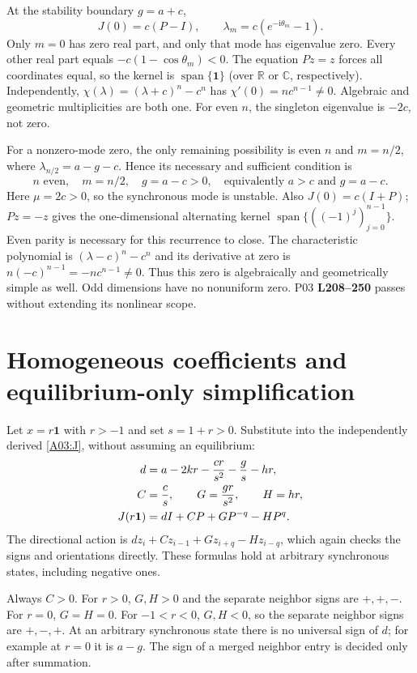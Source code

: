 \documentclass[11pt]{article}
\newcommand{\RR}{\mathbb R}
\newcommand{\CC}{\mathbb C}
\newcommand{\one}{\mathbf 1}
\newcommand{\lin}[1]{\textbf{L#1}}
\begin{document}
At the stability boundary $g=a+c$,
\[
 J(0)=c(P-I),\qquad
 \lambda_m=c(e^{-\mathrm i\theta_m}-1).
\]
Only $m=0$ has zero real part, and only that mode has eigenvalue zero.
Every other real part equals $-c(1-\cos\theta_m)<0$. The equation
$Pz=z$ forces all coordinates equal, so the kernel is
$\operatorname{span}\{\one\}$ (over $\RR$ or $\CC$, respectively).
Independently, $\chi(\lambda)=(\lambda+c)^n-c^n$ has
$\chi'(0)=n c^{n-1}\ne0$. Algebraic and geometric multiplicities are both
one. For even $n$, the singleton eigenvalue is $-2c$, not zero.

For a nonzero-mode zero, the only remaining possibility is even $n$ and
$m=n/2$, where $\lambda_{n/2}=a-g-c$. Hence its necessary and sufficient
condition is
\[
 n\text{ even},\quad m=n/2,\quad g=a-c>0,
 \quad\text{equivalently }a>c\text{ and }g=a-c.
\]
Here $\mu=2c>0$, so the synchronous mode is unstable. Also $J(0)=c(I+P)$;
$Pz=-z$ gives the one-dimensional alternating kernel
$\operatorname{span}\{((-1)^j)_{j=0}^{n-1}\}$. Even parity is necessary
for this recurrence to close. The characteristic polynomial is
$(\lambda-c)^n-c^n$ and its derivative at zero is
$n(-c)^{n-1}=-n c^{n-1}\ne0$. Thus this zero is algebraically and
geometrically simple as well. Odd dimensions have no nonuniform zero.
P03 \lin{208--250} passes without extending its nonlinear scope.

\section{Homogeneous coefficients and equilibrium-only simplification}
Let $x=r\one$ with $r>-1$ and set $s=1+r>0$. Substitute into the
independently derived \eqref{A03:J}, without assuming an equilibrium:
\begin{align}
 d&=a-2kr-\frac{cr}{s^2}-\frac{g}{s}-hr,\notag\\
 C&=\frac{c}{s},\qquad G=\frac{gr}{s^2},\qquad H=hr,\label{A03:homcoef}\\
 J(r\one)&=dI+CP+GP^{-q}-HP^q.\label{A03:homJ}
\end{align}
The directional action is $d z_i+Cz_{i-1}+Gz_{i+q}-Hz_{i-q}$, which
again checks the signs and orientations directly. These formulas hold at
arbitrary synchronous states, including negative ones.

Always $C>0$. For $r>0$, $G,H>0$ and the separate neighbor signs are
$+,+,-$. For $r=0$, $G=H=0$. For $-1<r<0$, $G,H<0$, so the separate
neighbor signs are $+,-,+$. At an arbitrary synchronous state there is
no universal sign of $d$; for example at $r=0$ it is $a-g$. The sign of a
merged neighbor entry is decided only after summation.
\end{document}
